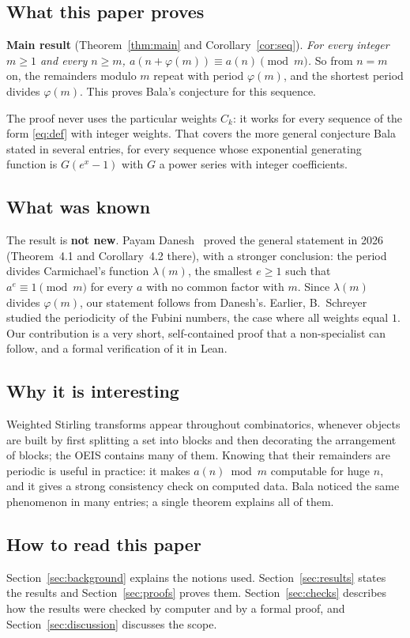\documentclass[11pt,a4paper]{article}
\theoremstyle{definition}
\theoremstyle{remark}
\begin{document}
\subsection{What this paper proves}
\textbf{Main result} (Theorem~\ref{thm:main} and Corollary~\ref{cor:seq}). \emph{For every integer $m\ge1$ and every
$n\ge m$, $a(n+\varphi(m))\equiv a(n)\pmod m$.} So from $n=m$ on, the remainders modulo $m$ repeat with period
$\varphi(m)$, and the shortest period divides $\varphi(m)$. This proves Bala's conjecture for this sequence.

The proof never uses the particular weights $C_k$: it works for every sequence of the form \eqref{eq:def} with
integer weights. That covers the more general conjecture Bala stated in several entries, for every sequence whose
exponential generating function is $G(e^x-1)$ with $G$ a power series with integer coefficients.

\subsection{What was known}
The result is \textbf{not new}. Payam Danesh~\cite{danesh} proved the general statement in 2026 (Theorem~4.1 and
Corollary~4.2 there), with a stronger conclusion: the period divides Carmichael's function $\lambda(m)$, the smallest
$e\ge1$ such that $a^e\equiv1\pmod m$ for every $a$ with no common factor with $m$. Since $\lambda(m)$ divides
$\varphi(m)$, our statement follows from Danesh's. Earlier, B.~Schreyer~\cite{schreyer} studied the periodicity of the
Fubini numbers, the case where all weights equal $1$. Our contribution is a very short, self-contained proof that a
non-specialist can follow, and a formal verification of it in Lean.

\subsection{Why it is interesting}
Weighted Stirling transforms appear throughout combinatorics, whenever objects are built by first splitting a set into
blocks and then decorating the arrangement of blocks; the OEIS contains many of them. Knowing that their remainders are
periodic is useful in practice: it makes $a(n)\bmod m$ computable for huge $n$, and it gives a strong consistency check
on computed data. Bala noticed the same phenomenon in many entries; a single theorem explains all of them.

\subsection{How to read this paper}
Section~\ref{sec:background} explains the notions used. Section~\ref{sec:results} states the results and
Section~\ref{sec:proofs} proves them. Section~\ref{sec:checks} describes how the results were checked by computer and by a
formal proof, and Section~\ref{sec:discussion} discusses the scope.
\end{document}
